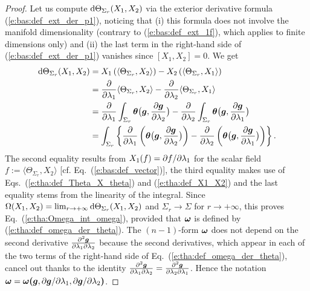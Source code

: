 \begin{proof}
Let us compute $\mathrm{d} \Theta_{\Sigma_r} (X_1,X_2)$ via the exterior derivative formula
(\ref{e:bas:def_ext_der_p1}), noticing that (i) this formula
does not involve the manifold dimensionality (contrary to (\ref{e:bas:def_ext_1f}),
which applies to finite dimensions only) and (ii) the last term in the right-hand
side of (\ref{e:bas:def_ext_der_p1}) vanishes since $[X_1,X_2] = 0$.
We get
\begin{align}
    \mathrm{d} \Theta_{\Sigma_r} (X_1,X_2) & = X_1\left( \langle \Theta_{\Sigma_r}, X_2 \rangle \right)
        -  X_2\left( \langle \Theta_{\Sigma_r}, X_1 \rangle \right) \nonumber \\
        & =  \frac{\partial }{\partial \lambda_1} \langle \Theta_{\Sigma_r}, X_2 \rangle -
            \frac{\partial }{\partial \lambda_2} \langle \Theta_{\Sigma_r}, X_1 \rangle \nonumber \\
        & = \frac{\partial }{\partial \lambda_1} \int_{\Sigma_r} \bm{\theta}\bm{\big(}\bm{g}, \frac{\partial \bm{g}}{\partial \lambda_2} \bm{\big)}
        - \frac{\partial }{\partial \lambda_2} \int_{\Sigma_r} \bm{\theta}\bm{\big(}\bm{g}, \frac{\partial \bm{g}}{\partial \lambda_1} \bm{\big)}   \nonumber \\
        & = \int_{\Sigma_r} \left\{ \frac{\partial }{\partial \lambda_1}
        \left( \bm{\theta} \bm{\big(}\bm{g}, \frac{\partial \bm{g}}{\partial \lambda_2} \bm{\big)} \right)
        - \frac{\partial }{\partial \lambda_2}\left( \bm{\theta}\bm{\big(}\bm{g}, \frac{\partial \bm{g}}{\partial \lambda_1} \bm{\big)} \right) \right\} .
        \nonumber
\end{align}
The second equality results from $X_1(f) = {\partial f}/{\partial \lambda_1}$ for the scalar field
$f := \langle \Theta_{\Sigma_r}, X_2 \rangle$ [cf. Eq.~(\ref{e:bas:def_vector})], the third equality
makes use of Eqs.~(\ref{e:tha:def_Theta_X_theta}) and (\ref{e:tha:def_X1_X2})
and the last equality stems from the linearity of the integral.
Since $\Omega(X_1,X_2) = \lim_{r\to+\infty} \mathrm{d} \Theta_{\Sigma_r} (X_1,X_2)$ and
$\Sigma_r \to \Sigma$ for $r\to+\infty$,
this proves Eq.~(\ref{e:tha:Omega_int_omega}), provided that
$\bm{\omega}$ is defined by (\ref{e:tha:def_omega_der_theta}).
The $(n-1)$-form $\bm{\omega}$ does not depend on the second derivative
$\frac{\partial^2\bm{g}}{\partial\lambda_1\partial\lambda_2}$ because the second derivatives,
which appear in each of the two terms of the right-hand side of
Eq.~(\ref{e:tha:def_omega_der_theta}), cancel out thanks to the
identity
$\frac{\partial^2\bm{g}}{\partial\lambda_1\partial\lambda_2} = \frac{\partial^2\bm{g}}{\partial\lambda_2\partial\lambda_1}$.
Hence the notation $\bm{\omega} = \bm{\omega}\textbf{(}\bm{g},  {\partial \bm{g}}/{\partial \lambda_1}, {\partial \bm{g}}/{\partial \lambda_2} \textbf{)}$.
\end{proof}

